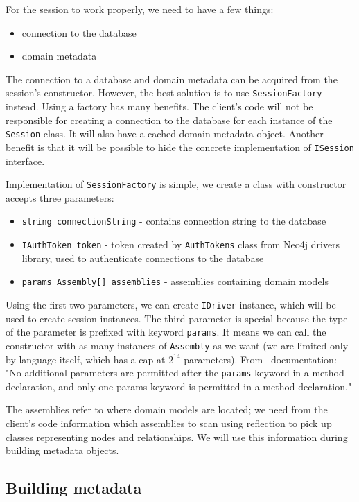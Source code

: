 For the session to work properly, we need to have a few things:

\begin{itemize}
    \item connection to the database
    \item domain metadata
\end{itemize}

The connection to a database and domain metadata can be acquired from the session's constructor.
However, the best solution is to use \texttt{SessionFactory} instead.
Using a factory has many benefits.
The client's code will not be responsible for creating a connection to the database for each instance of the \texttt{Session} class.
It will also have a cached domain metadata object.
Another benefit is that it will be possible to hide the concrete implementation of \texttt{ISession} interface.

Implementation of \texttt{SessionFactory} is simple, we create a class with constructor accepts three parameters:
\begin{itemize}
    \item {\texttt{string connectionString} - contains connection string to the database}
    \item {\texttt{IAuthToken token} - token created by \texttt{AuthTokens} class from Neo4j drivers library, used to authenticate connections to the database}
    \item {\texttt{params Assembly[] assemblies} - assemblies containing domain models}
\end{itemize}
Using the first two parameters, we can create \texttt{IDriver} instance, which will be used to create session instances. The third parameter is special
because the type of the parameter is prefixed with keyword \texttt{params}. It means we can call the constructor with as many instances of \texttt{Assembly} as we want
(we are limited only by language itself, which has a cap at $2^{14}$ parameters). From \CS\ documentation:
"No additional parameters are permitted after the \texttt{params} keyword in a method declaration, and only one params keyword is permitted in a method declaration." \cite{wagner_params_nodate}

The assemblies refer to where domain models are located;
we need from the client's code information which assemblies to scan using reflection to pick up classes representing nodes and relationships.
We will use this information during building metadata objects.

\subsection {Building metadata}

